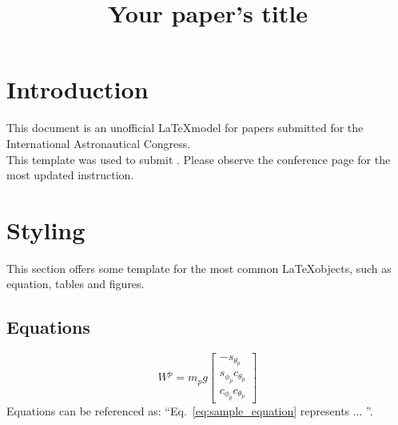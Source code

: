 \documentclass[]{iac_class}
\begin{document}

\title{Your paper's title}




\maketitle
\thispagestyle{fancy} %

\section{Introduction}
This document is an unofficial \LaTeX model for papers submitted for the International Astronautical Congress. 
\\This template was used to submit \cite{fari2021vector}.
Please observe the conference page for the most updated instruction. 

\section{Styling}\label{sec:styling}
This section offers some template for the most common \LaTeX objects, such as equation, tables and figures.

\subsection{Equations}\label{s_sec:equation} 
\begin{equation}\label{eq:sample_equation}
    W^p=m_pg\left[\begin{matrix}
-s_{\theta_p}\\s_{\phi_p}c_{\theta_p}\\c_{\phi_p}c_{\theta_p}
\end{matrix} \right]
\end{equation}
Equations can be referenced as: ``Eq.~\ref{eq:sample_equation} represents ... ''.
\end{document}
